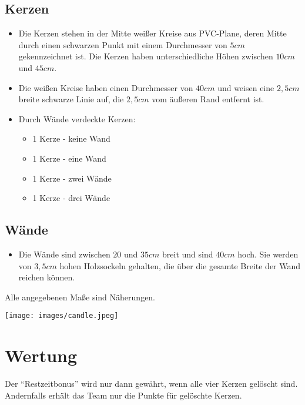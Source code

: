 \documentclass[a4paper,12pt]{article}
\begin{document}
\subsection{Kerzen}
\begin{itemize}
	\item Die Kerzen stehen in der Mitte weißer Kreise aus PVC-Plane, deren
		Mitte durch einen schwarzen Punkt mit einem Durchmesser von $5
		cm$ gekennzeichnet ist. Die Kerzen haben unterschiedliche Höhen
		zwischen $10 cm$ und $45 cm$.
	\item Die weißen Kreise haben einen Durchmesser von $40 cm$ und weisen
		eine $2,5 cm$ breite schwarze Linie auf, die $2,5 cm$ vom
		äußeren Rand entfernt ist.
\renewcommand{\labelitemi}{$\star$}
\renewcommand{\labelitemii}{$\checkmark$}
	\item Durch Wände verdeckte Kerzen:
	\begin{itemize}
		\item 1 Kerze - keine Wand
		\item 1 Kerze - eine Wand
		\item 1 Kerze - zwei Wände
		\item 1 Kerze - drei Wände
	\end{itemize}
\end{itemize}

\subsection{Wände}
\begin{itemize}
	\item Die Wände sind zwischen $20$ und $35cm$ breit und sind $40cm$
		hoch. Sie werden von $3,5 cm$ hohen Holzsockeln gehalten, die
		über die gesamte Breite der Wand reichen können.
\end{itemize}
\begin{center}
	Alle angegebenen Maße sind Näherungen.
\end{center}
\lightConditions
\begin{center}
\texttt{[image: images/candle.jpeg]}
\end{center}

\section{Wertung}
Der "`Restzeitbonus"' wird nur dann gewährt, wenn alle vier Kerzen gelöscht
sind. Andernfalls erhält das Team nur die Punkte für gelöschte Kerzen.
\end{document}
